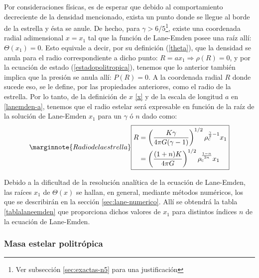 Por consideraciones físicas, es de esperar que debido al comportamiento decreciente de la densidad mencionado, exista un punto donde se llegue al borde de la estrella y ésta se anule. De hecho, para $\gamma>6/5$\footnote{Ver subsección \ref{sec:exactas-n5} para una justificación}, existe una coordenada radial adimensional $x=x_1$ tal que la función de Lane-Emden posee una raíz allí: $\Theta(x_1)=0$. Esto equivale a decir, por su definición (\ref{theta}), que la densidad se anula para el radio correspondiente a dicho punto: $R=ax_1\Rightarrow\rho(R)=0$, y por la ecuación de estado (\ref{estadopolitropica}), tenemos que lo anterior también implica que la presión se anula allí: $P(R)=0$. A la coordenada radial $R$ donde sucede eso, se le define, por las propiedades anteriores, como el radio de la estrella. Por lo tanto, de la definición de $x$ \eqref{x} y de la escala de longitud $a$ en \eqref{lanemden-a}, tenemos que el radio estelar será expresable en función de la raíz de la solución de Lane-Emden $x_1$ para un $\gamma$ ó $n$  dado como:
\begin{equation}\label{radiopolitropico}\marginnote{Radio de la estrella}
\boxed{
\begin{aligned}
R&=\left(\frac{K\gamma}{4\pi G(\gamma-1)}\right)^{1/2}\rho_{\rm c}^{\frac{\gamma}{2}-1}x_1\\
&=\left(\frac{(1+n)K}{4\pi G}\right)^{1/2}\rho_{\rm c}^{\frac{1-n}{2n}}x_1
\end{aligned}}
\end{equation}

Debido a la dificultad de la resolución analítica de la ecuación de Lane-Emden, las raíces $x_1$ de $\Theta(x)$ se hallan, en general, mediante métodos numéricos, los que se describirán en la sección \ref{sec:lane-numerico}. Allí se obtendrá la tabla \ref{tablalaneemden} que proporciona dichos valores de $x_1$ para distintos índices $n$ de la ecuación de Lane-Emden.

\subsubsection{Masa estelar politrópica}


